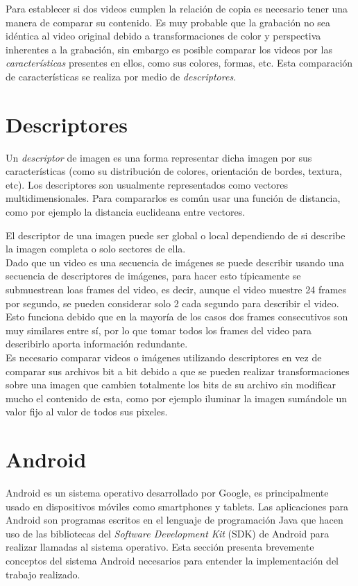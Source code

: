 Para establecer si dos videos cumplen la relación de copia es necesario tener una manera de comparar su contenido. Es muy probable que la grabación no sea idéntica al video original debido a transformaciones de color y perspectiva inherentes a la grabación, sin embargo es posible comparar los videos por las \textit{características} presentes en ellos, como sus colores, formas, etc. Esta comparación de características se realiza por medio de \emph{descriptores}.

\section{Descriptores}
Un \emph{descriptor} de imagen es una forma representar dicha imagen por sus características (como su distribución de colores, orientación de bordes, textura, etc). Los descriptores son usualmente representados como vectores multidimensionales. Para compararlos es común usar una función de distancia, como por ejemplo la distancia euclideana entre vectores.

El descriptor de una imagen puede ser global o local dependiendo de si describe la imagen completa o solo sectores de ella. \\
Dado que un video es una secuencia de imágenes se puede describir usando una secuencia de descriptores de imágenes, para hacer esto típicamente se submuestrean loas frames del video, es decir, aunque el video muestre 24 frames por segundo, se pueden considerar solo 2 cada segundo para describir el video. Esto funciona debido que en la mayoría de los casos dos frames consecutivos son muy similares entre sí, por lo que tomar todos los frames del video para describirlo aporta información redundante.\\
Es necesario comparar videos o imágenes utilizando descriptores en vez de comparar sus archivos bit a bit debido a que se pueden realizar transformaciones sobre una imagen que cambien totalmente los bits de su archivo sin modificar mucho el contenido de esta, como por ejemplo iluminar la imagen sumándole un valor fijo al valor de todos sus pixeles.

\section{Android}
Android es un sistema operativo desarrollado por Google, es principalmente usado en dispositivos móviles como smartphones y tablets. Las aplicaciones para Android son programas escritos en el lenguaje de programación Java que hacen uso de las bibliotecas del \emph{Software Development Kit} (SDK) de Android para realizar llamadas al sistema operativo. Esta sección presenta brevemente conceptos del sistema Android necesarios para entender la implementación del trabajo realizado.

